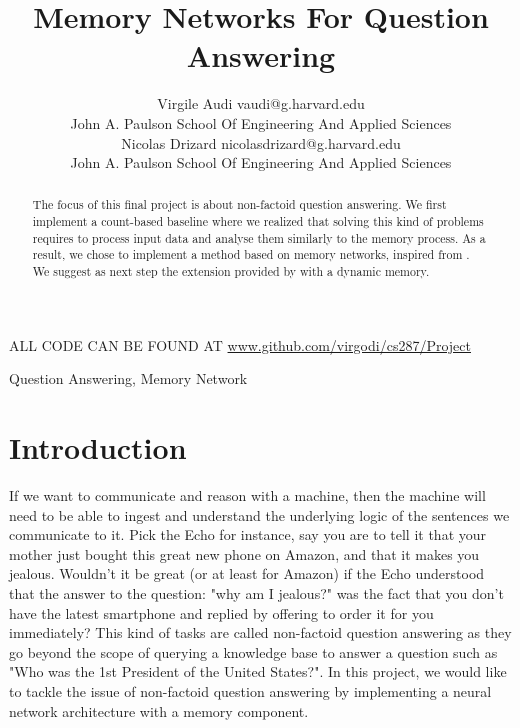 \documentclass[twoside,11pt]{article}
\begin{document}
\title{Memory Networks For Question Answering}

\author{\name Virgile Audi \email vaudi@g.harvard.edu \\
       \addr  John A. Paulson School Of Engineering And Applied Sciences\\
       \AND
       \name Nicolas Drizard \email nicolasdrizard@g.harvard.edu \\
       \addr John A. Paulson School Of Engineering And Applied Sciences}


\maketitle
\begin{center}
ALL CODE CAN BE FOUND AT \url{www.github.com/virgodi/cs287/Project}
\end{center}
\vspace{2cm}
\begin{abstract}%
The focus of this final project is about non-factoid question answering. We first implement a count-based baseline where we realized that solving this kind of problems requires to process input data and analyse them similarly to the memory process. As a result, we chose to implement a method based on memory networks, inspired from \cite{mem}. We suggest as next step the extension provided by \cite{dmn} with a dynamic memory. 
\end{abstract}

\begin{keywords}
  Question Answering, Memory Network
\end{keywords}
\vspace{2cm}
\section{Introduction}

If we want to communicate and reason with a machine, then the machine will need to be able to ingest and understand the underlying logic of the sentences we communicate to it. Pick the Echo for instance, say you are to tell it that your mother just bought this great new phone on Amazon, and that it makes you jealous. Wouldn't it be great (or at least for Amazon) if the Echo understood that the answer to the question: "why am I jealous?" was the fact that you don't have the latest smartphone and replied by offering to order it for you immediately? This kind of tasks are called non-factoid question answering as they go beyond the scope of querying a knowledge base to answer a question such as "Who was the 1st President of the United States?". In this project, we would like to tackle the issue of non-factoid question answering by implementing a neural network architecture with a memory component.
\end{document}

